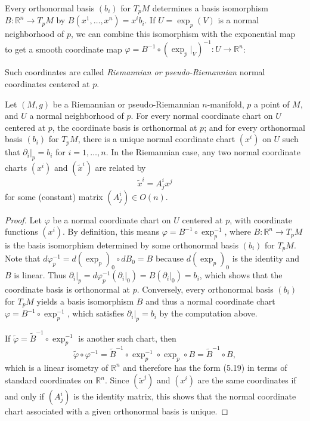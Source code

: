 Every orthonormal basis $(b_i)$ for $T_p M$ determines a basis isomorphism $B: \mathbb{R}^n \to T_p M$ by $B(x^1, \ldots, x^n) = x^i b_i$. If $U = \exp_p(V)$ is a normal neighborhood of $p$, we can combine this isomorphism with the exponential map to get a smooth coordinate map $\varphi = B^{-1} \circ (\exp_p |_V)^{-1}: U \to \mathbb{R}^n$:


Such coordinates are called \textit{Riemannian or pseudo-Riemannian} normal coordinates centered at $p$.

\begin{proposition}
\label{prop:uniqueness-normal-coordinates}

Let $(M,g)$ be a Riemannian or pseudo-Riemannian $n$-manifold, $p$ a point of $M$, and $U$ a normal neighborhood of $p$. For every normal coordinate chart on $U$ centered at $p$, the coordinate basis is orthonormal at $p$; and for every orthonormal basis $(b_i)$ for $T_p M$, there is a unique normal coordinate chart $(x^i)$ on $U$ such that $\partial_i|_p = b_i$ for $i = 1,\ldots,n$. In the Riemannian case, any two normal coordinate charts $(x^i)$ and $(\tilde{x}^i)$ are related by
\begin{equation}
\tilde{x}^i = A^i_j x^j \tag{5.19}
\end{equation}
for some (constant) matrix $(A^i_j) \in O(n)$.

\begin{proof}
Let $\varphi$ be a normal coordinate chart on $U$ centered at $p$, with coordinate functions $(x^i)$. By definition, this means $\varphi = B^{-1} \circ \exp_p^{-1}$, where $B: \mathbb{R}^n \to T_p M$ is the basis isomorphism determined by some orthonormal basis $(b_i)$ for $T_p M$. Note that $d\varphi_p^{-1} = d(\exp_p)_0 \circ dB_0 = B$ because $d(\exp_p)_0$ is the identity and $B$ is linear. Thus $\partial_i|_p = d\varphi_p^{-1}(\partial_i|_0) = B(\partial_i|_0) = b_i$, which shows that the coordinate basis is orthonormal at $p$. Conversely, every orthonormal basis $(b_i)$ for $T_p M$ yields a basis isomorphism $B$ and thus a normal coordinate chart $\varphi = B^{-1} \circ \exp_p^{-1}$, which satisfies $\partial_i|_p = b_i$ by the computation above.

If $\tilde{\varphi} = \tilde{B}^{-1} \circ \exp_p^{-1}$ is another such chart, then
\[
\tilde{\varphi} \circ \varphi^{-1} = \tilde{B}^{-1} \circ \exp_p^{-1} \circ \exp_p \circ B = \tilde{B}^{-1} \circ B,
\]
which is a linear isometry of $\mathbb{R}^n$ and therefore has the form (5.19) in terms of standard coordinates on $\mathbb{R}^n$. Since $(\tilde{x}^j)$ and $(x^i)$ are the same coordinates if and only if $(A^i_j)$ is the identity matrix, this shows that the normal coordinate chart associated with a given orthonormal basis is unique.
\end{proof}
\end{proposition}

